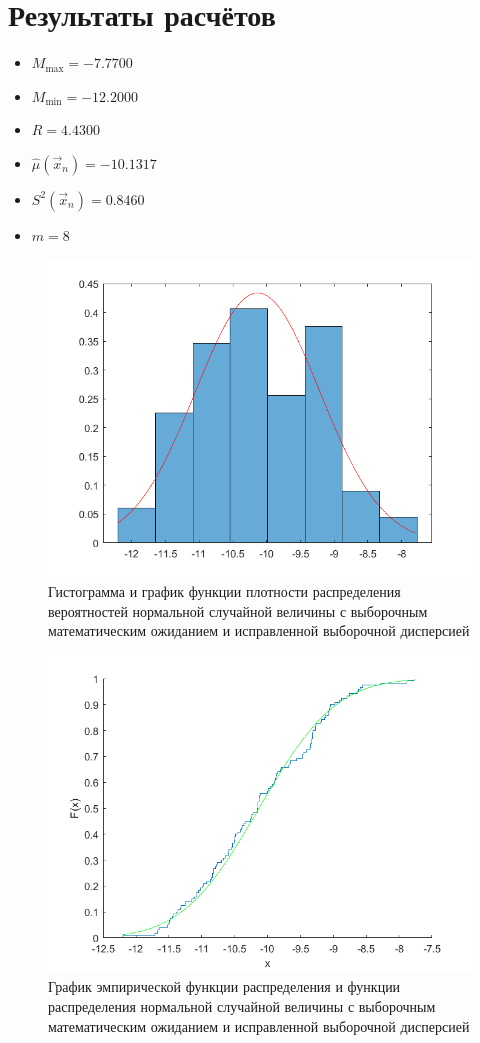 \documentclass[12pt]{report}
\begin{document}
\section*{Результаты расчётов}

\begin{itemize}
	\item $M_{\max} = -7.7700$
	\item $M_{\min} = -12.2000$
	\item $R = 4.4300$
	\item $\hat\mu(\vec x_n) = -10.1317$
	\item $S^2(\vec x_n) = 0.8460$
	\item $m = 8$
\end{itemize}

\begin{figure}[H]
	\centering
	\includegraphics[scale=0.7]{imgs/hist_dens.png}
	\caption{Гистограмма и график функции плотности распределения вероятностей нормальной случайной величины с выборочным математическим ожиданием и исправленной выборочной  дисперсией}
	\label{fig:1}
\end{figure}

\begin{figure}[H]
	\centering
	\includegraphics[scale=0.7]{imgs/func.png}
	\caption{График эмпирической функции распределения и функции распределения нормальной случайной величины с выборочным математическим ожиданием и исправленной выборочной  дисперсией}
	\label{fig:2}
\end{figure}
\end{document}
